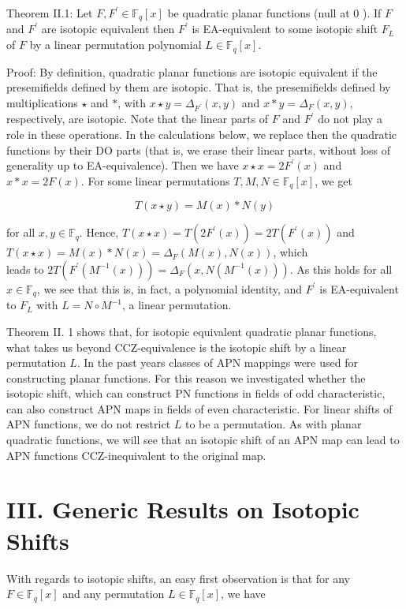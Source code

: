 \documentclass[10pt]{article}
\begin{document}
Theorem II.1: Let $F, F^{\prime} \in \mathbb{F}_{q}[x]$ be quadratic planar functions (null at 0 ). If $F$ and $F^{\prime}$ are isotopic equivalent then $F^{\prime}$ is EA-equivalent to some isotopic shift $F_{L}$ of $F$ by a linear permutation polynomial $L \in \mathbb{F}_{q}[x]$.

Proof: By definition, quadratic planar functions are isotopic equivalent if the presemifields defined by them are isotopic. That is, the presemifields defined by multiplications $\star$ and $*$, with $x \star y=\Delta_{F^{\prime}}(x, y)$ and $x * y=\Delta_{F}(x, y)$, respectively, are isotopic. Note that the linear parts of $F$ and $F^{\prime}$ do not play a role in these operations. In the calculations below, we replace then the quadratic functions by their DO parts (that is, we erase their linear parts, without loss of generality up to EA-equivalence). Then we have $x \star x= 2 F^{\prime}(x)$ and $x * x=2 F(x)$. For some linear permutations $T, M, N \in \mathbb{F}_{q}[x]$, we get


\begin{equation*}
T(x \star y)=M(x) * N(y) \tag{2}
\end{equation*}


for all $x, y \in \mathbb{F}_{q}$. Hence, $T(x \star x)=T\left(2 F^{\prime}(x)\right)=2 T\left(F^{\prime}(x)\right)$ and $T(x \star x)=M(x) * N(x)=\Delta_{F}(M(x), N(x))$, which\\
leads to $2 T\left(F^{\prime}\left(M^{-1}(x)\right)\right)=\Delta_{F}\left(x, N\left(M^{-1}(x)\right)\right)$. As this holds for all $x \in \mathbb{F}_{q}$, we see that this is, in fact, a polynomial identity, and $F^{\prime}$ is EA-equivalent to $F_{L}$ with $L=N \circ M^{-1}$, a linear permutation.

Theorem II. 1 shows that, for isotopic equivalent quadratic planar functions, what takes us beyond CCZ-equivalence is the isotopic shift by a linear permutation $L$. In the past years classes of APN mappings were used for constructing planar functions. For this reason we investigated whether the isotopic shift, which can construct PN functions in fields of odd characteristic, can also construct APN maps in fields of even characteristic. For linear shifts of APN functions, we do not restrict $L$ to be a permutation. As with planar quadratic functions, we will see that an isotopic shift of an APN map can lead to APN functions CCZ-inequivalent to the original map.

\section*{III. Generic Results on Isotopic Shifts}
With regards to isotopic shifts, an easy first observation is that for any $F \in \mathbb{F}_{q}[x]$ and any permutation $L \in \mathbb{F}_{q}[x]$, we have
\end{document}
